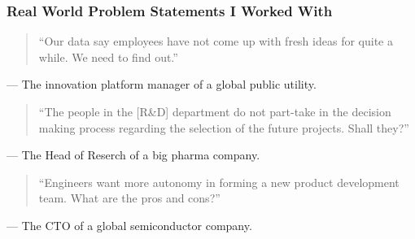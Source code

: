\documentclass[notes, aspectratio=1610]{beamer}
\begin{document}
\begin{frame}
	\frametitle{Real World Problem Statements I Worked With}
	\begin{quote}
		``Our data say employees have not come up with 
		fresh ideas for quite a while. We need to find out.''
	\end{quote}
	\raggedleft --- The innovation platform manager of a global public utility.

	\vspace{1em}

	\begin{quote}
		``The people in the [R\&D] department do not part-take in 
		the decision making process regarding the selection 
		of the future projects. Shall they?''
	\end{quote}
	\raggedleft --- The Head of Reserch of a big pharma company.
	\vspace{1em}

	\begin{quote}
		``Engineers want more autonomy in forming a new product 
		development team. What are the pros and cons?''
	\end{quote}
	\raggedleft --- The CTO of a global semiconductor company.
	
\end{frame}
\end{document}
